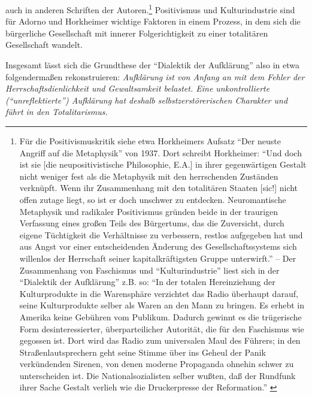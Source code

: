 \documentclass[12pt,a4paper,ngerman]{article}
\begin{document}
auch in anderen Schriften der Autoren.\footnote{Für die
  Positivismuskritik siehe etwa Horkheimers Aufsatz "`Der neuste
  Angriff auf die Metaphysik"' von 1937. Dort schreibt Horkheimer:
  "`Und doch ist sie [die neupositivistische Philosophie, E.A.] in
  ihrer gegenwärtigen Gestalt nicht weniger fest als die Metaphysik
  mit den herrschenden Zuständen verknüpft. Wenn ihr Zusammenhang mit
  den totalitären Staaten [sic!] nicht offen zutage liegt, so ist er
  doch unschwer zu entdecken. Neuromantische Metaphysik und radikaler
  Positivismus gründen beide in der traurigen Verfassung eines großen
  Teils des Bürgertums, das die Zuversicht, durch eigene Tüchtigkeit
  die Verhältnisse zu verbessern, restlos aufgegeben hat und aus Angst
  vor einer entscheidenden Änderung des Gesellschaftssystems sich
  willenlos der Herrschaft seiner kapitalkräftigsten Gruppe
  unterwirft."' \cite[S. 116]{horkheimer:1937} -- Der Zusammenhang von
  Faschismus und "`Kulturindustrie"' liest sich in der "`Dialektik der
  Aufklärung"' z.B. so: "`In der totalen Hereinziehung der
  Kulturprodukte in die Warensphäre verzichtet das Radio überhaupt
  darauf, seine Kulturprodukte selber als Waren an den Mann zu
  bringen. Es erhebt in Amerika keine Gebühren vom Publikum. Dadurch
  gewinnt es die trügerische Form desinteressierter, überparteilicher
  Autorität, die für den Faschismus wie gegossen ist. Dort wird das
  Radio zum universalen Maul des Führers; in den Straßenlautsprechern
  geht seine Stimme über ins Geheul der Panik verkündenden Sirenen,
  von denen moderne Propaganda ohnehin schwer zu unterscheiden ist.
  Die Nationalsozialisten selber wußten, daß der Rundfunk ihrer Sache
  Gestalt verlieh wie die Druckerpresse der Reformation."'  \cite[S.
  168]{adorno-horkheimer:1947} } Positivismus und Kulturindustrie sind
für Adorno und Horkheimer wichtige Faktoren in einem Prozess, in dem
sich die bürgerliche Gesellschaft mit innerer Folgerichtigkeit zu
einer totalitären Gesellschaft wandelt.

Insgesamt lässt sich die Grundthese der "`Dialektik der Aufklärung"' also in
etwa folgendermaßen rekonstruieren: {\em Aufklärung ist von Anfang an mit dem
Fehler der Herrschaftsdienlichkeit und Gewaltsamkeit belastet. Eine
unkontrollierte ("`unreflektierte"') Aufklärung hat deshalb
selbstzerstörerischen Charakter und führt in den Totalitarismus.}
\end{document}
